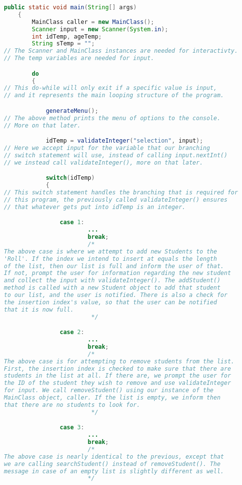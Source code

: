 \documentclass{article}
\begin{document}
\begin{large}
\begin{lstlisting}[language=Java]
	public static void main(String[] args)
	{
		MainClass caller = new MainClass();
		Scanner input = new Scanner(System.in);	
		int idTemp, ageTemp;
		String sTemp = "";	
// The Scanner and MainClass instances are needed for interactivty.
// The temp variables are needed for input.

		do
		{
// This do-while will only exit if a specific value is input,
// and it represents the main looping structure of the program.	

			generateMenu();
// The above method prints the menu of options to the console.
// More on that later.

			idTemp = validateInteger("selection", input);		
// Here we accept input for the variable that our branching 
// switch statement will use, instead of calling input.nextInt()
// we instead call validateInteger(), more on that later.

			switch(idTemp)
			{
// This switch statement handles the branching that is required for
// this program, the previously called validateInteger() ensures 
// that whatever gets put into idTemp is an integer.

				case 1:
						...
						break;
						/*
The above case is where we attempt to add new Students to the 
'Roll'. If the index we intend to insert at equals the length
of the list, then our list is full and inform the user of that.
If not, prompt the user for information regarding the new student
and collect the input with validateInteger(). The addStudent()
method is called with a new Student object to add that student
to our list, and the user is notified. There is also a check for
the insertion index's value, so that the user can be notified 
that it is now full.
						 */						

				case 2:
						...
						break;
						/*
The above case is for attempting to remove students from the list.
First, the insertion index is checked to make sure that there are
students in the list at all. If there are, we prompt the user for
the ID of the student they wish to remove and use validateInteger 
for input. We call removeStudent() using our instance of the 
MainClass object, caller. If the list is empty, we inform then 
that there are no students to look for.
						 */

				case 3:
						...
						break;
						/*
The above case is nearly identical to the previous, except that
we are calling searchStudent() instead of removeStudent(). The
message in case of an empty list is slightly different as well.
						*/


\end{lstlisting}
\end{large}
\end{document}
